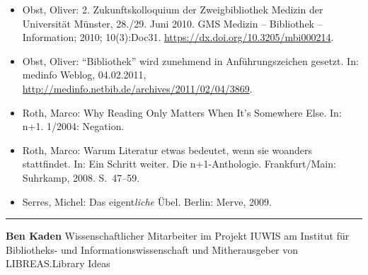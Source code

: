 \documentclass[output=paper]{langscibook}
\begin{document}
\begin{itemize}
\item Obst, Oliver: 2. Zukunftskolloquium der Zweigbibliothek Medizin der Universität Münster, 28./29. Juni 2010. GMS Medizin -- Bibliothek -- Information; 2010; 10(3):Doc31.  \url{https://dx.doi.org/10.3205/mbi000214}.

\item Obst, Oliver: \enquote{Bibliothek} wird zunehmend in Anführungszeichen
gesetzt. In: medinfo Weblog, 04.02.2011,
\url{http://medinfo.netbib.de/archives/2011/02/04/3869}.

\item Roth, Marco: Why Reading Only Matters When It's Somewhere Else. In: n+1. 1/2004: Negation.

\item Roth, Marco: Warum Literatur etwas bedeutet, wenn sie woanders stattfindet. In: Ein Schritt weiter. Die n+1-Anthologie. Frankfurt/Main:
Suhrkamp, 2008. S.~47--59.

\item Serres, Michel: Das eigent\emph{liche} Übel. Berlin: Merve, 2009.
\end{itemize}

\begin{center}\rule{0.5\linewidth}{0.5pt}\end{center}


\textbf{Ben Kaden} Wissenschaftlicher Mitarbeiter im Projekt IUWIS am
Institut für Bibliotheks- und Informationswissenschaft und
Mitherausgeber von LIBREAS.Library Ideas

\end{document}
